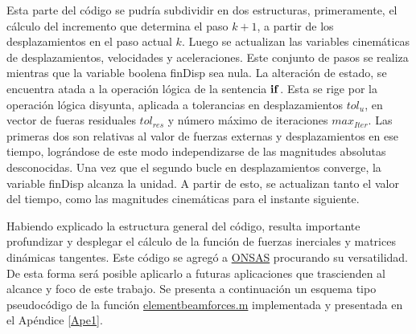 Esta parte del código se pudría subdividir en dos estructuras, primeramente, el cálculo del incremento que determina el paso $k+1$, a partir de los desplazamientos en el paso actual $k$. Luego se actualizan las variables cinemáticas de desplazamientos, velocidades y aceleraciones. Este conjunto de pasos se realiza mientras que la variable boolena finDisp sea nula. La alteración de estado, se encuentra atada a la operación lógica de la sentencia $\bf{if}$. Esta se rige por la operación lógica disyunta, aplicada a tolerancias en desplazamientos $tol_u$, en vector de fueras residuales $tol_{res}$ y número máximo de iteraciones $max_{Iter}$. Las primeras dos son relativas al valor de fuerzas externas y desplazamientos en ese tiempo, lográndose de este modo independizarse de las magnitudes absolutas desconocidas. Una vez que el segundo bucle en desplazamientos converge, la variable finDisp alcanza la unidad. A partir de esto, se actualizan tanto el valor del tiempo, como las magnitudes cinemáticas para el instante siguiente.

Habiendo explicado la estructura general del código, resulta importante profundizar y desplegar el cálculo de la función de fuerzas inerciales y matrices dinámicas tangentes. Este código se agregó a \href{https://github.com/ONSAS/ONSAS/}{ONSAS} procurando su versatilidad. De esta forma será posible aplicarlo a futuras aplicaciones que trascienden al alcance y foco de este trabajo. Se presenta a continuación un esquema tipo pseudocódigo de la función \href{https://github.com/ONSAS/ONSAS/blob/master/src/elementBeamForces.m}{elementbeamforces.m} implementada y presentada en el Apéndice \ref{Ape1}. 


